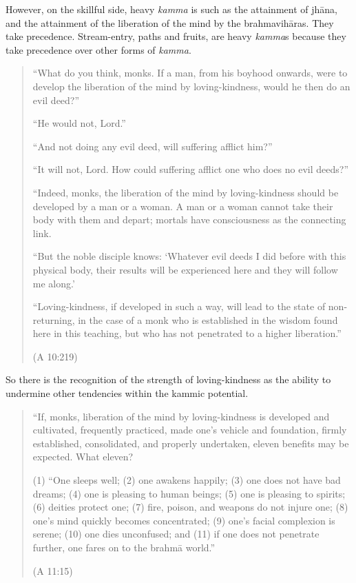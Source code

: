 However, on the skillful side, heavy \emph{kamma} is such as the
attainment of jhāna, and the attainment of the liberation of the mind by
the brahmavihāras. They take precedence. Stream-entry, paths and fruits,
are heavy \emph{kamma}s because they take precedence over other forms of
\emph{kamma}.

\begin{quotation}
“What do you think, monks. If a man, from his boyhood onwards, were to
develop the liberation of the mind by loving-kindness, would he then do
an evil deed?”

“He would not, Lord.”

“And not doing any evil deed, will suffering afflict him?”

“It will not, Lord. How could suffering afflict one who does no evil
deeds?”

“Indeed, monks, the liberation of the mind by loving-kindness should be
developed by a man or a woman. A man or a woman cannot take their body
with them and depart; mortals have consciousness as the connecting link.

“But the noble disciple knows: ‘Whatever evil deeds I did before with
this physical body, their results will be experienced here and they will
follow me along.’

“Loving-kindness, if developed in such a way, will lead to the state of
non-returning, in the case of a monk who is established in the wisdom
found here in this teaching, but who has not penetrated to a higher
liberation.”

\hfill(A 10:219)
\end{quotation}

So there is the recognition of the strength of loving-kindness as the
ability to undermine other tendencies within the kammic potential.

\begin{quotation}
“If, monks, liberation of the mind by loving-kindness is developed and
cultivated, frequently practiced, made one’s vehicle and foundation,
firmly established, consolidated, and properly undertaken, eleven
benefits may be expected. What eleven?

(1) “One sleeps well; (2) one awakens happily; (3) one does not have bad
dreams; (4) one is pleasing to human beings; (5) one is pleasing to
spirits; (6) deities protect one; (7) fire, poison, and weapons do not
injure one; (8) one’s mind quickly becomes concentrated; (9) one’s
facial complexion is serene; (10) one dies unconfused; and (11) if one
does not penetrate further, one fares on to the brahmā world.”

\hfill(A 11:15)
\end{quotation}

